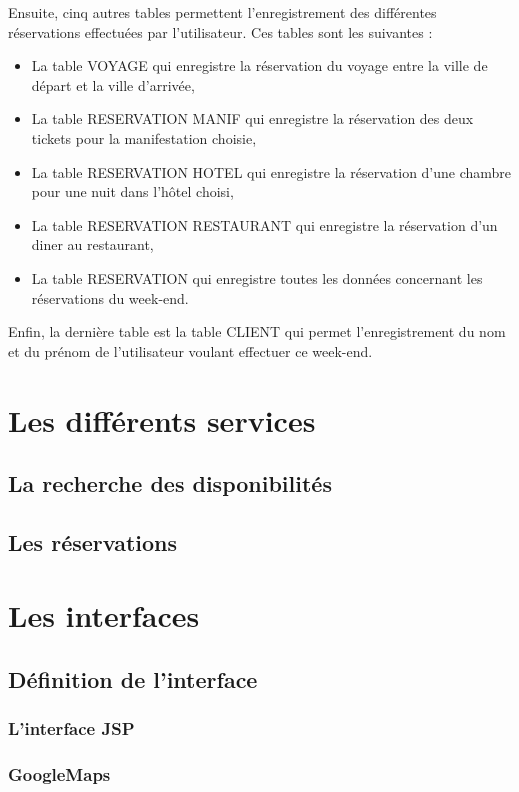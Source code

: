 \documentclass[11pt,a4paper]{article}
\begin{document}
Ensuite, cinq autres tables permettent l'enregistrement des différentes
réservations effectuées par l'utilisateur. Ces tables sont les suivantes :\\

\begin{itemize}
  \item La table VOYAGE qui enregistre la réservation du voyage entre la ville
  de départ et la ville d'arrivée,
  \item La table RESERVATION MANIF qui enregistre la réservation des deux tickets
  pour la manifestation choisie,
  \item La table RESERVATION HOTEL qui enregistre la réservation d'une chambre pour
  une nuit dans l'hôtel choisi,
  \item La table RESERVATION RESTAURANT qui enregistre la réservation d'un
  diner au restaurant,
  \item La table RESERVATION qui enregistre toutes les données concernant les
  réservations du week-end.\\
\end{itemize}

Enfin, la dernière table est la table CLIENT qui permet l'enregistrement du nom
et du prénom de l'utilisateur voulant effectuer ce week-end.


\section{Les différents services}
\subsection{La recherche des disponibilités}
\subsection{Les réservations}

\section{Les interfaces}
\subsection{Définition de l'interface}
\subsubsection{L'interface JSP}
\subsubsection{GoogleMaps}
\end{document}

